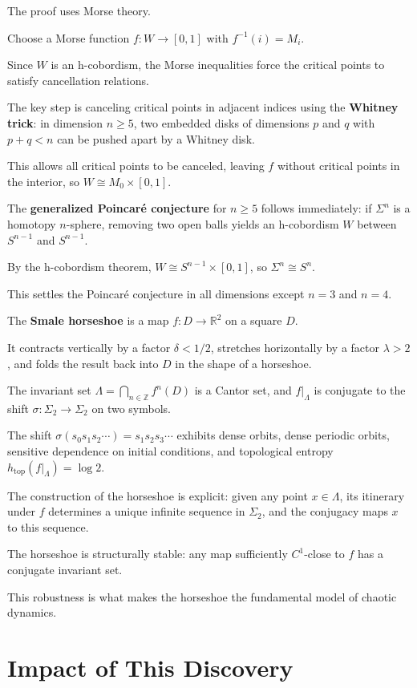 The proof uses Morse theory.

Choose a Morse function $f: W \to [0,1]$ with $f^{-1}(i) = M_i$.

Since $W$ is an h-cobordism, the Morse inequalities force the critical points to satisfy cancellation relations.

The key step is canceling critical points in adjacent indices using the \textbf{Whitney trick}: in dimension $n \geq 5$, two embedded disks of dimensions $p$ and $q$ with $p + q < n$ can be pushed apart by a Whitney disk.

This allows all critical points to be canceled, leaving $f$ without critical points in the interior, so $W \cong M_0 \times [0,1]$.

The \textbf{generalized Poincaré conjecture} for $n \geq 5$ follows immediately: if $\Sigma^n$ is a homotopy $n$-sphere, removing two open balls yields an h-cobordism $W$ between $S^{n-1}$ and $S^{n-1}$.

By the h-cobordism theorem, $W \cong S^{n-1} \times [0,1]$, so $\Sigma^n \cong S^n$.

This settles the Poincaré conjecture in all dimensions except $n = 3$ and $n = 4$.

The \textbf{Smale horseshoe} is a map $f: D \to \mathbb{R}^2$ on a square $D$.

It contracts vertically by a factor $\delta < 1/2$, stretches horizontally by a factor $\lambda > 2$, and folds the result back into $D$ in the shape of a horseshoe.

The invariant set $\Lambda = \bigcap_{n \in \mathbb{Z}} f^n(D)$ is a Cantor set, and $f|_\Lambda$ is conjugate to the shift $\sigma: \Sigma_2 \to \Sigma_2$ on two symbols.

The shift $\sigma(s_0 s_1 s_2 \cdots) = s_1 s_2 s_3 \cdots$ exhibits dense orbits, dense periodic orbits, sensitive dependence on initial conditions, and topological entropy $h_{\text{top}}(f|_\Lambda) = \log 2$.

The construction of the horseshoe is explicit: given any point $x \in \Lambda$, its itinerary under $f$ determines a unique infinite sequence in $\Sigma_2$, and the conjugacy maps $x$ to this sequence.

The horseshoe is structurally stable: any map sufficiently $C^1$-close to $f$ has a conjugate invariant set.

This robustness is what makes the horseshoe the fundamental model of chaotic dynamics.

\section{Impact of This Discovery}

